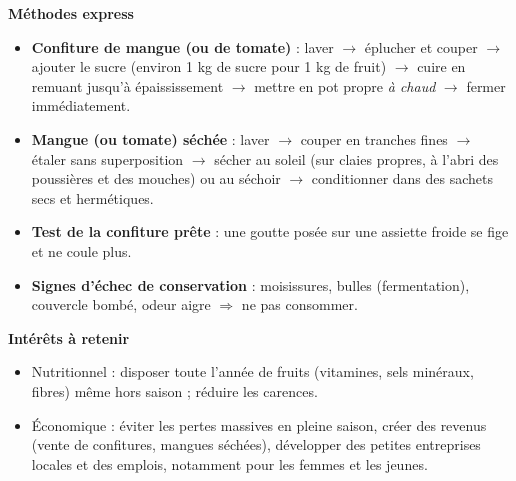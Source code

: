 \documentclass[11pt]{article}
\newcommand{\cle}[1]{{\popxbold\color{popdark}#1}}
\begin{document}
\begin{bilan}
\textbf{Méthodes express}
\begin{itemize}
  \item \textbf{Confiture de mangue (ou de tomate)} : laver $\rightarrow$ éplucher et couper $\rightarrow$ ajouter le sucre (environ 1 kg de sucre pour 1 kg de fruit) $\rightarrow$ cuire en remuant jusqu'à épaississement $\rightarrow$ mettre en pot propre \emph{à chaud} $\rightarrow$ fermer immédiatement.
  \item \textbf{Mangue (ou tomate) séchée} : laver $\rightarrow$ couper en tranches fines $\rightarrow$ étaler sans superposition $\rightarrow$ sécher au soleil (sur claies propres, à l'abri des poussières et des mouches) ou au séchoir $\rightarrow$ conditionner dans des sachets secs et hermétiques.
  \item \textbf{Test de la confiture prête} : une goutte posée sur une assiette froide se fige et ne coule plus.
  \item \textbf{Signes d'échec de conservation} : moisissures, bulles (fermentation), couvercle bombé, odeur aigre $\Rightarrow$ ne pas consommer.
\end{itemize}

\textbf{Intérêts à retenir}
\begin{itemize}
  \item \cle{Nutritionnel} : disposer toute l'année de fruits (vitamines, sels minéraux, fibres) même hors saison ; réduire les carences.
  \item \cle{Économique} : éviter les pertes massives en pleine saison, créer des revenus (vente de confitures, mangues séchées), développer des petites entreprises locales et des emplois, notamment pour les femmes et les jeunes.
\end{itemize}
\end{bilan}
\end{document}
